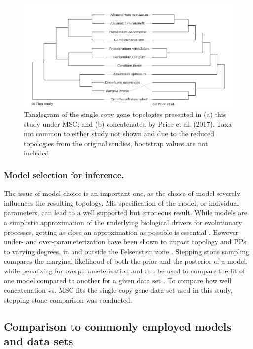 \documentclass[fleqn,10pt,lineno]{wlpeerj} %
\begin{document}
\begin{figure}[ht]
\centering
\includegraphics[width=\linewidth]{gonya-figs/Price-comparison.png}
\caption{Tanglegram of the single copy gene topologies presented in (a) this study under MSC; and (b) concatenated by Price et al. (2017). Taxa not common to either study not shown and due to the reduced topologies from the original studies, bootstrap values are not included.} 
\label{fig:tanglePrice}
\end{figure} 
\subsubsection*{Model selection for inference.} The issue of model choice is an important one, as the choice of model severely influences the resulting topology. 
Mis-specification of the model, or individual parameters, can lead to a well supported but erroneous result. 
While models are a simplistic approximation of the underlying biological drivers for evolutionary processes, getting as close an approximation as possible is essential \cite{box1979all}. 
However under- and over-parameterization have been shown to impact topology and PPs to varying degrees, in and outside the Felsenstein zone \cite{lemmon2004importance}. 
Stepping stone sampling compares the marginal likelihood of both the prior and the posterior of a model, while penalizing for overparameterization and can be used to compare the fit of one model compared to another for a given data set \cite{xie2010improving}. 
To compare how well concatenation vs. MSC fits the single copy gene data set used in this study, stepping stone comparison was conducted.

\subsection*{Comparison to commonly employed models and data sets}
\end{document}

